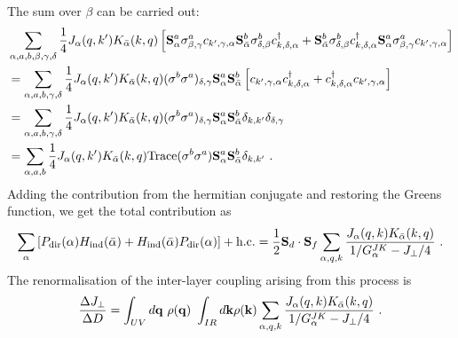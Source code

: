 The sum over \(\beta\) can be carried out:
\begin{equation}\begin{aligned}
	& \sum_{\alpha, a, b, \beta, \gamma, \delta}\frac{1}{4}J_\alpha(q, k^\prime) K_{\bar\alpha}(k, q) \left[{\bf S}^a_\alpha \sigma^a_{\beta,\gamma} c_{k^\prime,\gamma,\alpha} {\bf S}^b_{\bar\alpha}\sigma^b_{\delta, \beta} c^\dagger_{k,\delta,\alpha} + {\bf S}^b_{\bar\alpha}\sigma^b_{\delta, \beta} c^\dagger_{k,\delta,\alpha}{\bf S}^a_\alpha \sigma^a_{\beta,\gamma} c_{k^\prime,\gamma,\alpha} \right] \\
	&=\sum_{\alpha, a, b, \gamma, \delta}\frac{1}{4}J_\alpha(q, k^\prime) K_{\bar\alpha}(k, q) (\sigma^b \sigma^a)_{\delta,\gamma}{\bf S}^a_\alpha {\bf S}^b_{\bar\alpha} \left[ c_{k^\prime,\gamma,\alpha} c^\dagger_{k,\delta,\alpha} + c^\dagger_{k,\delta,\alpha} c_{k^\prime,\gamma,\alpha} \right]\\
																														 &=\sum_{\alpha, a, b, \gamma, \delta}\frac{1}{4}J_\alpha(q, k^\prime) K_{\bar\alpha}(k, q) (\sigma^b \sigma^a)_{\delta,\gamma}{\bf S}^a_\alpha {\bf S}^b_{\bar\alpha} \delta_{k,k^\prime}\delta_{\delta,\gamma}\\
																														 &=\sum_{\alpha, a, b}\frac{1}{4}J_\alpha(q, k^\prime) K_{\bar\alpha}(k, q) \text{Trace}(\sigma^b \sigma^a){\bf S}^a_\alpha {\bf S}^b_{\bar\alpha} \delta_{k,k^\prime}~.
\end{aligned}\end{equation}
Adding the contribution from the hermitian conjugate and restoring the Greens function, we get the total contribution as
\begin{equation}\begin{aligned}
	\sum_\alpha \left[P_\text{dir}(\alpha)H_\text{ind}(\bar\alpha) + H_\text{ind}(\bar\alpha)P_\text{dir}(\alpha)\right] + \text{h.c.} = \frac{1}{2}{\bf S}_d \cdot {\bf S}_{f} \sum_{\alpha,q,k} \frac{J_\alpha(q, k)K_{\bar\alpha}(k, q)}{1/G_\alpha^{JK} - J_\perp / 4} ~.
\end{aligned}\end{equation}
The renormalisation of the inter-layer coupling arising from this process is
\begin{equation}\begin{aligned}\label{interRenormalisation}
	\frac{\Delta J_\perp}{\Delta D} = \int_{UV} d{\bf q} ~\rho({\bf q})~\int_{IR} d{\bf k} \rho({\bf k}) \sum_{\alpha,q,k} \frac{J_\alpha(q, k)K_{\bar\alpha}(k, q)}{1/G_\alpha^{JK} - J_\perp / 4}~.
\end{aligned}\end{equation}

